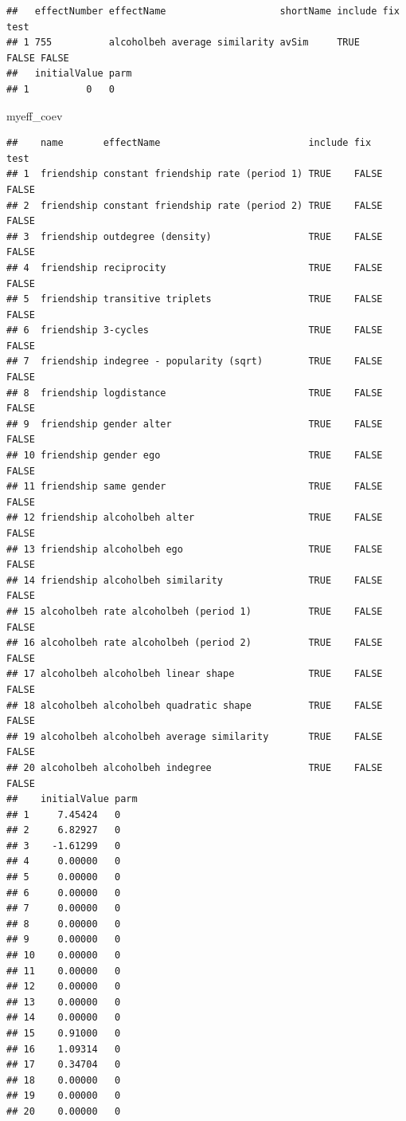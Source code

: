 \documentclass[
]{article}
\newenvironment{Shaded}{\begin{snugshade}}{\end{snugshade}}
\newcommand{\NormalTok}[1]{#1}
\begin{document}
\begin{verbatim}
##   effectNumber effectName                    shortName include fix   test 
## 1 755          alcoholbeh average similarity avSim     TRUE    FALSE FALSE
##   initialValue parm
## 1          0   0
\end{verbatim}

\begin{Shaded}
\begin{Highlighting}[]
\NormalTok{myeff\_coev}
\end{Highlighting}
\end{Shaded}

\begin{verbatim}
##    name       effectName                          include fix   test 
## 1  friendship constant friendship rate (period 1) TRUE    FALSE FALSE
## 2  friendship constant friendship rate (period 2) TRUE    FALSE FALSE
## 3  friendship outdegree (density)                 TRUE    FALSE FALSE
## 4  friendship reciprocity                         TRUE    FALSE FALSE
## 5  friendship transitive triplets                 TRUE    FALSE FALSE
## 6  friendship 3-cycles                            TRUE    FALSE FALSE
## 7  friendship indegree - popularity (sqrt)        TRUE    FALSE FALSE
## 8  friendship logdistance                         TRUE    FALSE FALSE
## 9  friendship gender alter                        TRUE    FALSE FALSE
## 10 friendship gender ego                          TRUE    FALSE FALSE
## 11 friendship same gender                         TRUE    FALSE FALSE
## 12 friendship alcoholbeh alter                    TRUE    FALSE FALSE
## 13 friendship alcoholbeh ego                      TRUE    FALSE FALSE
## 14 friendship alcoholbeh similarity               TRUE    FALSE FALSE
## 15 alcoholbeh rate alcoholbeh (period 1)          TRUE    FALSE FALSE
## 16 alcoholbeh rate alcoholbeh (period 2)          TRUE    FALSE FALSE
## 17 alcoholbeh alcoholbeh linear shape             TRUE    FALSE FALSE
## 18 alcoholbeh alcoholbeh quadratic shape          TRUE    FALSE FALSE
## 19 alcoholbeh alcoholbeh average similarity       TRUE    FALSE FALSE
## 20 alcoholbeh alcoholbeh indegree                 TRUE    FALSE FALSE
##    initialValue parm
## 1     7.45424   0   
## 2     6.82927   0   
## 3    -1.61299   0   
## 4     0.00000   0   
## 5     0.00000   0   
## 6     0.00000   0   
## 7     0.00000   0   
## 8     0.00000   0   
## 9     0.00000   0   
## 10    0.00000   0   
## 11    0.00000   0   
## 12    0.00000   0   
## 13    0.00000   0   
## 14    0.00000   0   
## 15    0.91000   0   
## 16    1.09314   0   
## 17    0.34704   0   
## 18    0.00000   0   
## 19    0.00000   0   
## 20    0.00000   0
\end{verbatim}
\end{document}
